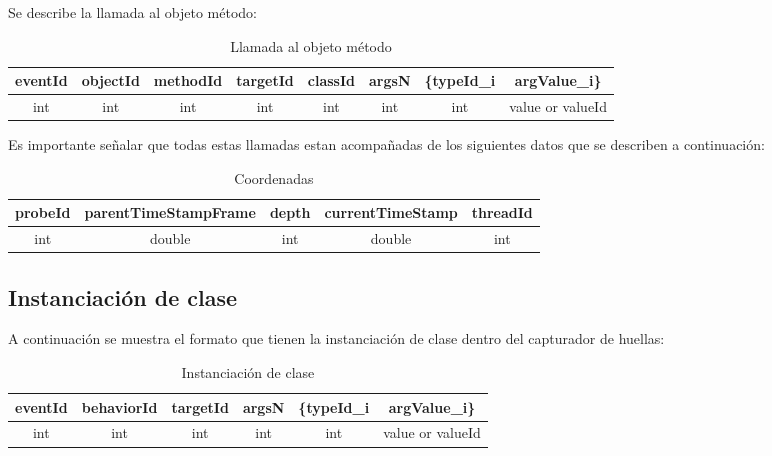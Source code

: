 \documentclass[10pt,a4paper]{article}
\begin{document}
Se describe la llamada al objeto método:\\

\begin{table}[!h]
\begin{center}
\begin{tabular}{| c | c | c | c | c | c | c | c |}
\hline
eventId & objectId & methodId & targetId & classId & argsN & \{typeId_{i} & argValue_{i}\}\\
\hline
int & int & int & int & int & int & int & value or valueId\footnotemark[1]\\
\hline
\end{tabular}
\caption{Llamada al objeto método} 
\end{center}
\end{table}

Es importante señalar que todas estas llamadas estan acompañadas de los siguientes datos que se describen a continuación:\\

\begin{table}[!h]
\begin{center}
\begin{tabular}{| c | c | c | c | c |}
\hline
probeId & parentTimeStampFrame & depth & currentTimeStamp & threadId\\
\hline
int & double & int & double & int \\
\hline
\end{tabular}
\caption{Coordenadas} 
\label{Coordenadas}
\end{center}
\end{table}


\newpage

\subsection{Instanciación de clase}

A continuación se muestra el formato que tienen la instanciación de clase dentro del capturador de huellas:\\

\begin{table}[!h]
\begin{center}
\begin{tabular}{| c | c | c | c | c | c |}
\hline
eventId & behaviorId & targetId & argsN & \{typeId_{i} & argValue_{i}\}\\
\hline
int & int & int & int & int & value or valueId\footnotemark[1]\\
\hline
\end{tabular}
\caption{Instanciación de clase} 
\end{center}
\end{table}
\end{document}
